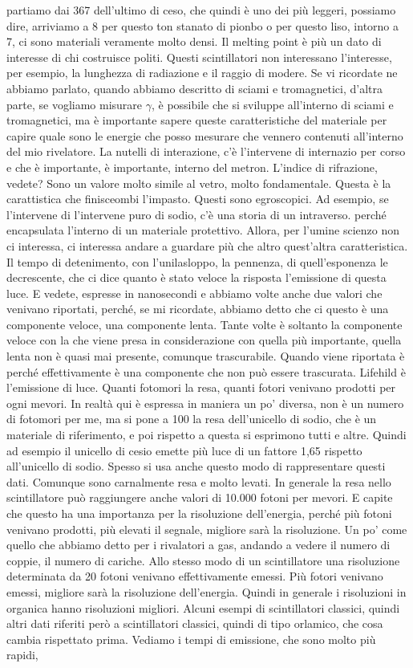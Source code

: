 {partiamo dai 367 dell'ultimo di ceso, che quindi è uno dei più leggeri, possiamo dire, arriviamo a 8 per questo ton stanato di pionbo o per questo liso, intorno a 7, ci sono materiali veramente molto densi. Il melting point è più un dato di interesse di chi costruisce politi. Questi scintillatori non interessano l'interesse, per esempio, la lunghezza di radiazione e il raggio di modere. Se vi ricordate ne abbiamo parlato, quando abbiamo descritto di sciami e tromagnetici, d'altra parte, se vogliamo misurare $\gamma$, è possibile che si sviluppe all'interno di sciami e tromagnetici, ma è importante sapere queste caratteristiche del materiale per capire quale sono le energie che posso mesurare che vennero contenuti all'interno del mio rivelatore. La nutelli di interazione, c'è l'intervene di internazio per corso e che è importante, è importante, interno del metron. L'indice di rifrazione, vedete? Sono un valore molto simile al vetro, molto fondamentale. Questa è la carattistica che finisceombi l'impasto. Questi sono egroscopici. Ad esempio, se l'intervene di l'intervene puro di sodio, c'è una storia di un intraverso. perché encapsulata l'interno di un materiale protettivo. Allora, per l'umine scienzo non ci interessa, ci interessa andare a guardare più che altro quest'altra caratteristica. Il tempo di detenimento, con l'unilasloppo, la pennenza, di quell'esponenza le decrescente, che ci dice quanto è stato veloce la risposta l'emissione di questa luce. E vedete, espresse in nanosecondi e abbiamo volte anche due valori che venivano riportati, perché, se mi ricordate, abbiamo detto che ci questo è una componente veloce, una componente lenta. Tante volte è soltanto la componente veloce con la che viene presa in considerazione con quella più importante, quella lenta non è quasi mai presente, comunque trascurabile. Quando viene riportata è perché effettivamente è una componente che non può essere trascurata. Lifehild è l'emissione di luce. Quanti fotomori la resa, quanti fotori venivano prodotti per ogni mevori. In realtà qui è espressa in maniera un po' diversa, non è un numero di fotomori per me, ma si pone a 100 la resa dell'unicello di sodio, che è un materiale di riferimento, e poi rispetto a questa si esprimono tutti e altre. Quindi ad esempio il unicello di cesio emette più luce di un fattore 1,65 rispetto all'unicello di sodio. Spesso si usa anche questo modo di rappresentare questi dati. Comunque sono carnalmente resa e molto levati. In generale la resa nello scintillatore può raggiungere anche valori di 10.000 fotoni per mevori. E capite che questo ha una importanza per la risoluzione dell'energia, perché più fotoni venivano prodotti, più elevati il segnale, migliore sarà la risoluzione. Un po' come quello che abbiamo detto per i rivalatori a gas, andando a vedere il numero di coppie, il numero di cariche. Allo stesso modo di un scintillatore una risoluzione determinata da 20 fotoni venivano effettivamente emessi. Più fotori venivano emessi, migliore sarà la risoluzione dell'energia. Quindi in generale i risoluzioni in organica hanno risoluzioni migliori. Alcuni esempi di scintillatori classici, quindi altri dati riferiti però a scintillatori classici, quindi di tipo orlamico, che cosa cambia rispettato prima. Vediamo i tempi di emissione, che sono molto più rapidi, }
